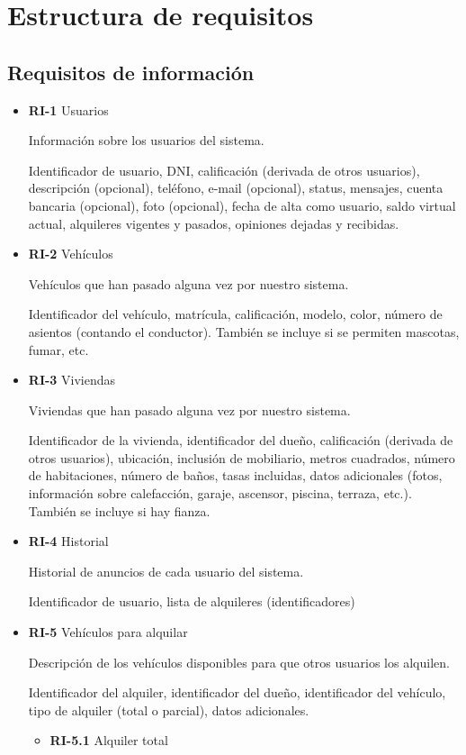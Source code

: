 \documentclass[11pt,spanish]{article} %
\begin{document}
\section{Estructura de requisitos}
\subsection{Requisitos de información}
\begin{itemize}
	\item \textbf{RI-1} Usuarios

	Información sobre los usuarios del sistema.

	Identificador de usuario, DNI, calificación (derivada de otros usuarios), descripción (opcional), teléfono, e-mail (opcional), status, mensajes, cuenta bancaria (opcional), foto (opcional), fecha de alta como usuario, saldo virtual actual, alquileres vigentes y pasados, opiniones dejadas y recibidas.

	\item \textbf{RI-2} Vehículos

	Vehículos que han pasado alguna vez por nuestro sistema.

	Identificador del vehículo, matrícula, calificación, modelo, color, número de asientos (contando el conductor).
	También se incluye si se permiten mascotas, fumar, etc.

	\item \textbf{RI-3} Viviendas

	Viviendas que han pasado alguna vez por nuestro sistema.

	Identificador de la vivienda, identificador del dueño, calificación (derivada de otros usuarios), ubicación, inclusión de mobiliario, metros cuadrados, número de habitaciones, número de baños, tasas incluidas, datos adicionales (fotos, información sobre calefacción, garaje, ascensor, piscina, terraza, etc.).
	También se incluye si hay fianza.

	\item \textbf{RI-4} Historial

	Historial de anuncios de cada usuario del sistema.

	Identificador de usuario, lista de alquileres (identificadores)

	\item \textbf{RI-5} Vehículos para alquilar

	Descripción de los vehículos disponibles para que otros usuarios los alquilen.

	Identificador del alquiler, identificador del dueño, identificador del vehículo, tipo de alquiler (total o parcial), datos adicionales.
	\begin{itemize}
		\item \textbf{RI-5.1} Alquiler total


\end{itemize}
\end{itemize}
\end{document}

